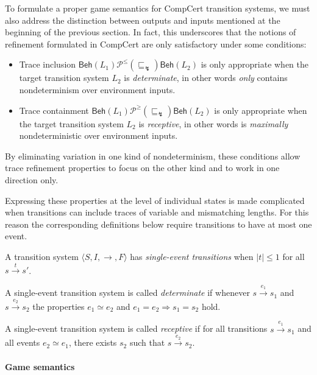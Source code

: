 \documentclass[sigplan,10pt,review,anonymous]{acmart}
\newcommand{\kw}[1]{\ensuremath{\mathsf{#1}}}
\newcommand{\refby}{\sqsubseteq}
\begin{document}
To formulate a proper game semantics for
CompCert transition systems,
we must also address the distinction between
outputs and inputs mentioned
at the beginning of the previous section.
In fact,
this underscores that
the notions of refinement
formulated in CompCert
are only satisfactory under some conditions:
\begin{itemize}
  \item
    Trace inclusion
    $\kw{Beh}(L_1)
     \mathrel{\mathcal{P}^\le(\refby_\lightning)}
     \kw{Beh}(L_2)$
    is only appropriate when
    the target transition system $L_2$
    is \emph{determinate},
    in other words \emph{only} contains nondeterminism
    over environment inputs.
  \item
    Trace containment
    $\kw{Beh}(L_1)
     \mathrel{\mathcal{P}^\ge(\refby_\lightning)}
     \kw{Beh}(L_2)$
    is only appropriate when
    the target transition system $L_2$
    is \emph{receptive},
    in other words is \emph{maximally} nondeterministic
    over environment inputs.
\end{itemize}
By eliminating variation in one kind of nondeterminism,
these conditions allow trace refinement properties
to focus on the other kind
and to work in one direction only.

Expressing these properties at the level of individual states
is made complicated when transitions can include
traces of variable and mismatching lengths.
For this reason the corresponding definitions below
require transitions to have at most one event.

\begin{definition} %
A transition system
$\langle S, I, {\rightarrow}, F \rangle$
has \emph{single-event transitions}
when $|t| \le 1$ for all $s \stackrel{t}{\rightarrow} s'$.

A single-event transition system is called
\emph{determinate}
if whenever
$s \stackrel{e_1}{\longrightarrow} s_1$ and
$s \stackrel{e_2}{\longrightarrow} s_2$
the properties $e_1 \simeq e_2$ and $e_1 = e_2 \Rightarrow s_1 = s_2$ hold.

A single-event transition system is called
\emph{receptive}
if for all transitions $s \stackrel{e_1}{\longrightarrow} s_1$
and all events $e_2 \simeq e_1$,
there exists $s_2$ such that
$s \stackrel{e_2}{\longrightarrow} s_2$.
\end{definition}

\paragraph{Game semantics}
\end{document}
